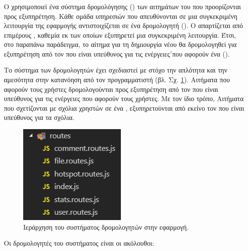 
\subsubsection{}

Ο  χρησιμοποιεί ένα σύστημα δρομολόγησης () των αιτημάτων του  που προορίζονται προς εξυπηρέτηση. Κάθε ομάδα υπηρεσιών που απευθύνονται σε μια συγκεκριμένη λειτουργία της εφαρμογής αντιστοιχίζεται σε ένα δρομολογητή (). Ο  απαρτίζεται από επιμέρους , καθεμία εκ των οποίων εξυπηρετεί μια συγκεκριμένη λειτουργία. Έτσι, στο παραπάνω παράδειγμα, το αίτημα για τη δημιουργία νέου  θα δρομολογηθεί για εξυπηρέτηση από τον  που είναι υπεύθυνος για τις ενέργειες΄που αφορούν ένα  (). 

Το σύστημα των δρομολογητών έχει σχεδιαστεί με στόχο την απλότητα και την αμεσότητα στην κατανόηση από τον προγραμματιστή (βλ. Σχ. \ref{routes}). Αιτήματα που αφορούν τους χρήστες δρομολογούνται προς εξυπηρέτηση από τον  που είναι υπεύθυνος για τις ενέργειες που αφορούν τους χρήστες. Με τον ίδιο τρόπο, Αιτήματα που σχετίζονται με σχόλια χρηστών σε ένα , εξυπηρετούνται από εκείνο τον  που είναι υπεύθυνος για τα σχόλια. 

\begin{figure}[h]
    \centering
    \includegraphics[scale=1]{figures/routes.png}
    \caption{Ιεράρχηση του συστήματος δρομολογητών στην εφαρμογή.}
    \label{routes}
\end{figure}

Οι δρομολογητές του συστήματος είναι οι ακόλουθοι:

